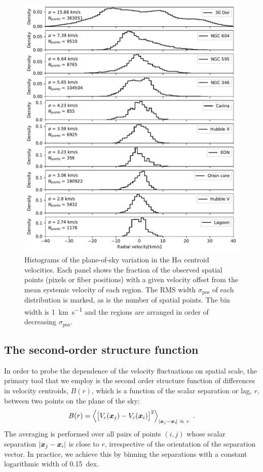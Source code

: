 \documentclass[fleqn,usenatbib, useAMS, a4paper]{mnras}
\newcommand\pos{\ensuremath{_{\mathrm{pos}}}}
\newcommand\ha{\ensuremath{\text{H}\alpha}}
\begin{document}
\begin{figure}
 \centering
 \includegraphics[width=5in]{Figures/pdfs}\par
 \caption{
   Histograms of the plane-of-sky variation in the \ha{} centroid velocities.
   Each panel shows the fraction of the observed spatial points
   (pixels or fiber positions)
   with a given velocity offset from the mean systemic velocity of each region.
   The RMS width \(\sigma\pos\) of each distribution is marked,
   as is the number of spatial points.
   The bin width is \SI{1}{km.s^{-1}} and the regions are arranged
   in order of decreasing \(\sigma\pos\).
 }
 \label{fig:pdfs}
\end{figure}


\subsection{The second-order structure function}
\label{sec:second-order-struct}


In order to probe the dependence of the velocity fluctuations
on spatial scale,
the primary tool that we employ is
the second order structure function of differences in velocity centroids,
$B(r)$, which is a function of the scalar separation or lag, \(r\),
between two points on the plane of the sky:
%
\newcommand\Abs[1]{\vert #1\vert}
\begin{equation}\label{eq:Br}
  B(r) = \left\langle 
  \bigl[
  V_{c}(\xx_j) - V_{c}(\xx_i)
  \bigr]^{2} \right \rangle_{\Abs{\xx_j - \xx_i\!} \ \approx \ r} \ .
\end{equation}
The averaging is performed over all pairs of points
\((i, j)\)
whose scalar separation \(\Abs{\xx_j - \xx_i}\) is close to \(r\),
irrespective of the orientation of the separation vector.
In practice, we achieve this by binning the separations with a constant
logarithmic width of \SI{0.15}{dex}.
\end{document}
